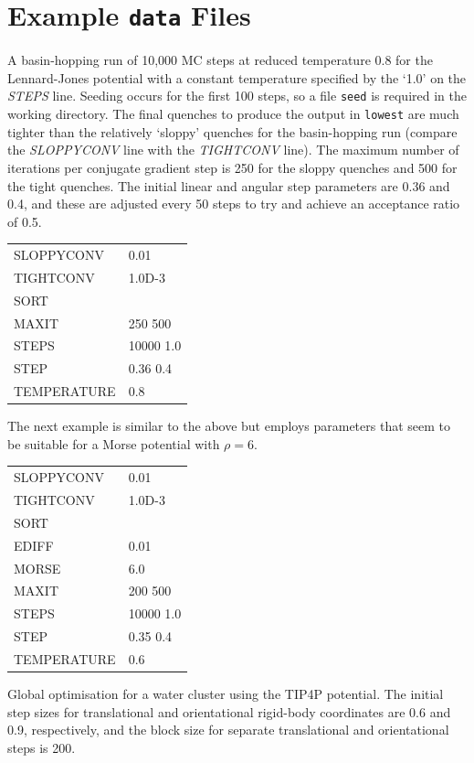 \documentclass[12pt,a4paper,dvips]{article}
\begin{document}


\section{Example {\tt data} Files}

A basin-hopping run of 10,000 MC steps at reduced temperature $0.8$ for the Lennard-Jones potential
with a constant temperature specified by the `1.0' on the {\it STEPS\/} line.
Seeding occurs for the first 100 steps, so a file {\tt seed} is required in the 
working directory. The final quenches to produce the output in {\tt lowest} are much
tighter than the relatively `sloppy' quenches for the basin-hopping run (compare the
{\it SLOPPYCONV\/} line with the {\it TIGHTCONV\/} line). The maximum number of iterations per
conjugate gradient step is 250 for the sloppy quenches and 500 for the tight quenches.
The initial linear and angular step parameters are 0.36 and 0.4, and these are adjusted
every 50 steps to try and achieve an acceptance ratio of 0.5.

\medskip
\begin{tabular}{ll}
SLOPPYCONV & 0.01 \\
TIGHTCONV & 1.0D-3 \\
SORT \\
MAXIT & 250 500 \\
STEPS & 10000 1.0 \\
STEP & 0.36 0.4 \\
TEMPERATURE & 0.8 \\
\end{tabular}
\medskip

\noindent The next example is similar to the above but employs parameters that seem
to be suitable for a Morse potential with $\rho=6$.

\medskip
\begin{tabular}{ll}
SLOPPYCONV & 0.01 \\
TIGHTCONV & 1.0D-3 \\
SORT \\
EDIFF & 0.01\\
MORSE & 6.0\\
MAXIT & 200 500\\
STEPS & 10000 1.0\\
STEP & 0.35 0.4\\
TEMPERATURE & 0.6\\
\end{tabular}
\medskip

\noindent Global optimisation for a water cluster using the TIP4P potential.
The initial step sizes for translational and orientational rigid-body coordinates are
0.6 and 0.9, respectively, and the block size for separate translational and orientational
steps is 200.
\end{document}
